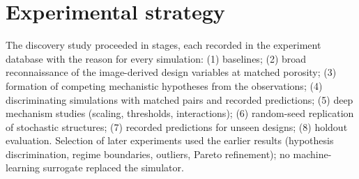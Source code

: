 \section{Experimental strategy}
\label{sec:strategy}
The discovery study proceeded in stages, each recorded in the experiment database with the reason for every simulation: (1) baselines; (2) broad reconnaissance of the image-derived design variables at matched porosity; (3) formation of competing mechanistic hypotheses from the observations; (4) discriminating simulations with matched pairs and recorded predictions; (5) deep mechanism studies (scaling, thresholds, interactions); (6) random-seed replication of stochastic structures; (7) recorded predictions for unseen designs; (8) holdout evaluation. Selection of later experiments used the earlier results (hypothesis discrimination, regime boundaries, outliers, Pareto refinement); no machine-learning surrogate replaced the simulator.


